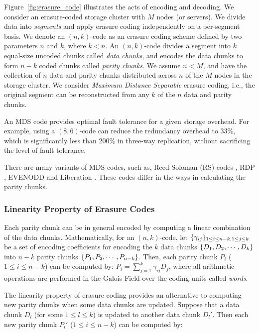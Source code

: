 Figure~\ref{fig:erasure_code} illustrates the acts of encoding and decoding. 
We consider an erasure-coded storage cluster with $M$ nodes (or servers).  We
divide data into {\em segments} and apply erasure coding independently on a
per-segment basis.  We denote an $(n,k)$-code as an erasure coding scheme
defined by two parameters $n$ and $k$, where $k<n$.  An $(n,k)$-code divides a
segment into $k$ equal-size uncoded chunks called {\em data chunks}, and
encodes the data chunks to form $n-k$ coded chunks called {\em parity chunks}.
We assume $n < M$, and have the collection of $n$ data and parity chunks
distributed across $n$ of the $M$ nodes in the storage cluster.  We consider
{\em Maximum Distance Separable} erasure coding, i.e., the original segment
can be reconstructed from any $k$ of the $n$ data and parity chunks. 

An MDS code provides optimal fault tolerance for a given storage overhead. For
example, using a $(8,6)$-code can reduce the redundancy overhead to $33\%$,
which is significantly less than $200\%$ in three-way replication, without
sacrificing the level of fault tolerance. 

There are many variants of MDS codes, such as, Reed-Soloman (RS) codes
\cite{reed60}, RDP \cite{corbett04}, EVENODD \cite{plank08} and Liberation
\cite{blaum95}. These codes differ in the ways in calculating the parity chunks.

\subsubsection{Linearity Property of Erasure Codes}

Each parity chunk can be in general encoded by computing a linear combination
of the data chunks.  Mathematically, for an $(n,k)$-code, let
$\lbrace \gamma_{ij} \rbrace_{1\le i\le n-k, 1\le j\le k}$ be a set of encoding
coefficients for encoding the $k$ data chunks $\lbrace D_1, D_2,\cdots,D_k \rbrace$ into
$n-k$ parity chunks $\lbrace P_1,P_2,\cdots,P_{n-k} \rbrace$.  Then, each parity chunk
$P_i$ ($1\le i\le n-k$) can be computed by:
$P_i = \sum_{j=1}^{k} \gamma_{ij} D_j$, 
where all arithmetic operations are performed in the Galois Field over the
coding units called {\em words}. 

The linearity property of erasure coding provides an alternative to computing
new parity chunks when some data chunks are updated.  Suppose that a data
chunk $D_l$ (for some $1\le l\le k$) is updated to another data chunk $D_l'$. 
Then each new parity chunk $P_i'$ ($1\le i\le n-k$) can be computed by:

